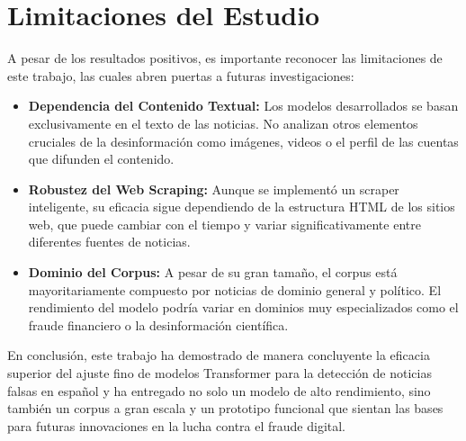 \section{Limitaciones del Estudio}
A pesar de los resultados positivos, es importante reconocer las limitaciones de este trabajo, las cuales abren puertas a futuras investigaciones:
\begin{itemize}
    \item \textbf{Dependencia del Contenido Textual:} Los modelos desarrollados se basan exclusivamente en el texto de las noticias. No analizan otros elementos cruciales de la desinformación como imágenes, videos o el perfil de las cuentas que difunden el contenido.
    \item \textbf{Robustez del Web Scraping:} Aunque se implementó un scraper inteligente, su eficacia sigue dependiendo de la estructura HTML de los sitios web, que puede cambiar con el tiempo y variar significativamente entre diferentes fuentes de noticias.
    \item \textbf{Dominio del Corpus:} A pesar de su gran tamaño, el corpus está mayoritariamente compuesto por noticias de dominio general y político. El rendimiento del modelo podría variar en dominios muy especializados como el fraude financiero o la desinformación científica.
\end{itemize}

En conclusión, este trabajo ha demostrado de manera concluyente la eficacia superior del ajuste fino de modelos Transformer para la detección de noticias falsas en español y ha entregado no solo un modelo de alto rendimiento, sino también un corpus a gran escala y un prototipo funcional que sientan las bases para futuras innovaciones en la lucha contra el fraude digital.